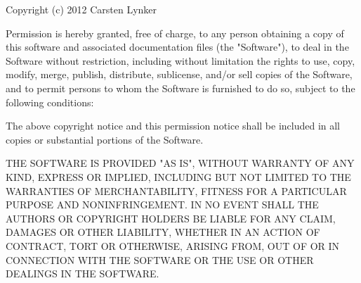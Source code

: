 \documentclass[11pt,parskip=half,a4paper]{scrartcl}
\begin{document}
Copyright (c) 2012 Carsten Lynker

Permission is hereby granted, free of charge, to any person obtaining a copy of this software and associated documentation files (the "Software"), to deal in the Software without restriction, including without limitation the rights to use, copy, modify, merge, publish, distribute, sublicense, and/or sell copies of the Software, and to permit persons to whom the Software is furnished to do so, subject to the following conditions:

The above copyright notice and this permission notice shall be included in all copies or substantial portions of the Software.

THE SOFTWARE IS PROVIDED "AS IS", WITHOUT WARRANTY OF ANY KIND, EXPRESS OR IMPLIED, INCLUDING BUT NOT LIMITED TO THE WARRANTIES OF MERCHANTABILITY, FITNESS FOR A PARTICULAR PURPOSE AND NONINFRINGEMENT. IN NO EVENT SHALL THE AUTHORS OR COPYRIGHT HOLDERS BE LIABLE FOR ANY CLAIM, DAMAGES OR OTHER LIABILITY, WHETHER IN AN ACTION OF CONTRACT, TORT OR OTHERWISE, ARISING FROM, OUT OF OR IN CONNECTION WITH THE SOFTWARE OR THE USE OR OTHER DEALINGS IN THE SOFTWARE.
\end{document}
